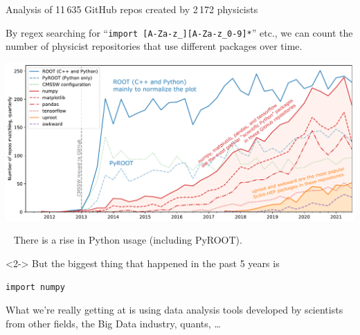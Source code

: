 \documentclass[aspectratio=169]{beamer}
\begin{document}
\begin{frame}{Analysis of 11\,635 GitHub repos created by 2\,172 physicists}
\vspace{0.25 cm}

By regex searching for ``\texttt{import [A-Za-z_][A-Za-z_0-9]*}'' etc., we can count the number of physicist repositories that use different packages over time.

\vspace{0.2 cm}

\includegraphics[width=\linewidth]{PLOTS/gihub-package-fullstudy.pdf}
\end{frame}

\begin{frame}[fragile]{\mbox{ }}
\Large
There is a rise in Python usage (including PyROOT).

\vspace{1.5 cm}
\begin{uncoverenv}<2->
But the biggest thing that happened in the past 5 years is

\begin{center}
\begin{minipage}{3.5 cm}
\begin{verbatim}
import numpy
\end{verbatim}
\end{minipage}
\end{center}

\vspace{0.2 cm}
What we're really getting at is using data analysis tools developed by scientists from other fields, the Big Data industry, quants, \dots
\end{uncoverenv}
\end{frame}
\end{document}
